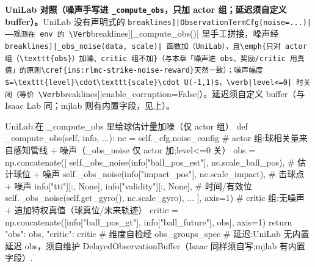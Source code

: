 \textbf{UniLab 对照（噪声手写进 \texttt{\_compute\_obs}，只加 actor 组；延迟须自定义 buffer）。}UniLab 没有声明式的 \Verb[breaklines]|ObservationTermCfg(noise=...)|——观测在 env 的 \Verb[breaklines]|_compute_obs()| 里手工拼接，噪声经 \Verb[breaklines]|_obs_noise(data, scale)| 函数加（UniLab），且\emph{只对 actor 组（\texttt{obs}）加噪、critic 组不加}（与本章「噪声进 obs、奖励/critic 用真值」的原则\cref{ins:rlmc-strike-noise-reward}天然一致）；噪声幅度 $=\texttt{level}\cdot\texttt{scale}\cdot U(-1,1)$，\verb|level<=0| 时关闭（等价 \Verb[breaklines]|enable_corruption=False|）。延迟须自定义 buffer（与 Isaac Lab 同；mjlab 则有内置字段，见上）。

\begin{codebox}[Python]{UniLab:在 \_compute\_obs 里给球估计量加噪（仅 actor 组）}
def _compute_obs(self, info, ...):
    nc = self._cfg.noise_config
    # actor 组:球相关量来自感知管线 + 噪声（_obs_noise 仅 actor 加;level<=0 关）
    obs = np.concatenate([
        self._obs_noise(info["ball_pos_est"], nc.scale_ball_pos),   # 估计球位 + 噪声
        self._obs_noise(info["impact_pos"],  nc.scale_impact),      # 击球点 + 噪声
        info["tti"][:, None], info["validity"][:, None],            # 时间/有效位
        self._obs_noise(self.get_gyro(), nc.scale_gyro), ...
    ], axis=1)
    # critic 组:无噪声 + 追加特权真值（球真位/未来轨迹）
    critic = np.concatenate([info["ball_pos_gt"], info["ball_future"], obs], axis=1)
    return {"obs": obs, "critic": critic}      # 维度自检经 obs_groups_spec
# 延迟:UniLab 无内置延迟 obs，须自维护 DelayedObservationBuffer（Isaac 同样须自写;mjlab 有内置字段）.
\end{codebox}



